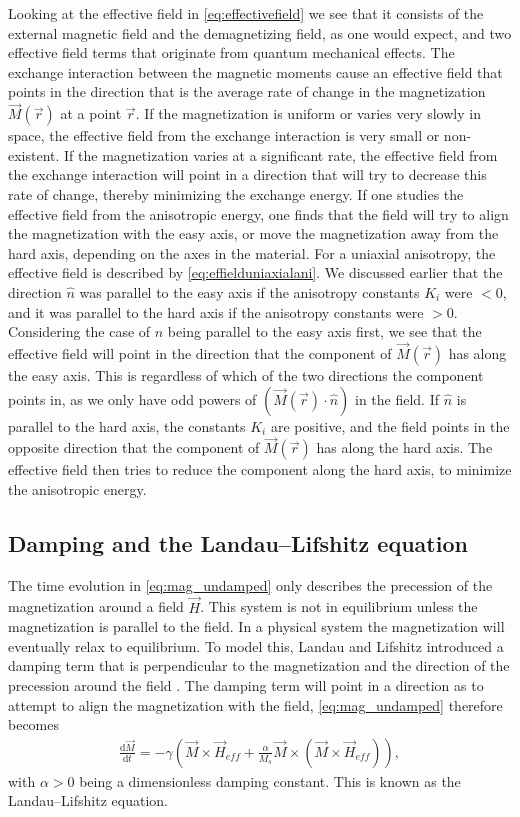 \documentclass[12pt, a4paper]{article}		%
\numberwithin{equation}{section}
\begin{document}
Looking at the effective field in \eqref{eq:effectivefield} we see that it consists of the external magnetic field and the demagnetizing field, as one would expect, and two effective field terms that originate from quantum mechanical effects. The exchange interaction between the magnetic moments cause an effective field that points in the direction that is the average rate of change in the magnetization $\vec{M}(\vec{r})$ at a point $\vec{r}$. If the magnetization is uniform or varies very slowly in space, the effective field from the exchange interaction is very small or non-existent. If the magnetization varies at a significant rate, the effective field from the exchange interaction will point in a direction that will try to decrease this rate of change, thereby minimizing the exchange energy. If one studies the effective field from the anisotropic energy, one finds that the field will try to align the magnetization with the easy axis, or move the magnetization away from the hard axis, depending on the axes in the material. For a uniaxial anisotropy, the effective field is described by \eqref{eq:effielduniaxialani}. We discussed earlier that the direction $\hat{n}$ was parallel to the easy axis if the anisotropy constants $K_i$ were $<0$, and it was parallel to the hard axis if the anisotropy constants were $>0$. Considering the case of $\hat{n}$ being parallel to the easy axis first, we see that the effective field will point in the direction that the component of $\vec{M}(\vec{r})$ has along the easy axis. This is regardless of which of the two directions the component points in, as we only have odd powers of $(\vec{M}(\vec{r})\cdot\hat{n})$ in the field. If $\hat{n}$ is parallel to the hard axis, the constants $K_i$ are positive, and the field points in the opposite direction that the component of $\vec{M}(\vec{r})$ has along the hard axis. The effective field then tries to reduce the component along the hard axis, to minimize the anisotropic energy.

\subsection{Damping and the Landau--Lifshitz equation}
The time evolution in \eqref{eq:mag_undamped} only describes the precession of the magnetization around a field $\vec{H}$. This system is not in equilibrium unless the magnetization is parallel to the field. In a physical system the magnetization will eventually relax to equilibrium. To model this, Landau and Lifshitz introduced a damping term that is perpendicular to the magnetization and the direction of the precession around the field \cite{LandauLifshitz1935}. The damping term will point in a direction as to attempt to align the magnetization with the field, \eqref{eq:mag_undamped} therefore becomes
\begin{align}
\label{eq:LL}
\frac{\textrm{d} \vec{M}}{\textrm{d} t} = -\gamma (\vec{M} \times \vec{H}_{eff} + \frac{\alpha}{M_s} \vec{M}\times(\vec{M}\times\vec{H}_{eff})),
\end{align}
with $\alpha > 0$ being a dimensionless damping constant. This is known as the Landau--Lifshitz equation.
\end{document}
